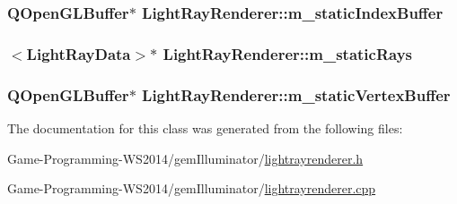\subsubsection[{m\+\_\+static\+Index\+Buffer}]{\setlength{\rightskip}{0pt plus 5cm}Q\+Open\+G\+L\+Buffer$\ast$ Light\+Ray\+Renderer\+::m\+\_\+static\+Index\+Buffer\hspace{0.3cm}{\ttfamily [protected]}}\label{class_light_ray_renderer_ab78cd6dadbb241b4d8929f5f1b60995a}
\hypertarget{class_light_ray_renderer_a6524c19725083f59fe41616998dcf111}{}
\subsubsection[{m\+\_\+static\+Rays}]{$<${\bf Light\+Ray\+Data}$>$$\ast$ Light\+Ray\+Renderer\+::m\+\_\+static\+Rays\hspace{0.3cm}{\ttfamily [protected]}}\label{class_light_ray_renderer_a6524c19725083f59fe41616998dcf111}
\hypertarget{class_light_ray_renderer_af21bb4b6a08c84b13753860a0a89b199}{}
\subsubsection[{m\+\_\+static\+Vertex\+Buffer}]{\setlength{\rightskip}{0pt plus 5cm}Q\+Open\+G\+L\+Buffer$\ast$ Light\+Ray\+Renderer\+::m\+\_\+static\+Vertex\+Buffer\hspace{0.3cm}{\ttfamily [protected]}}\label{class_light_ray_renderer_af21bb4b6a08c84b13753860a0a89b199}


The documentation for this class was generated from the following files\+:\begin{DoxyCompactItemize}
\item 
Game-\/\+Programming-\/\+W\+S2014/gem\+Illuminator/\hyperlink{lightrayrenderer_8h}{lightrayrenderer.\+h}\item 
Game-\/\+Programming-\/\+W\+S2014/gem\+Illuminator/\hyperlink{lightrayrenderer_8cpp}{lightrayrenderer.\+cpp}\end{DoxyCompactItemize}
